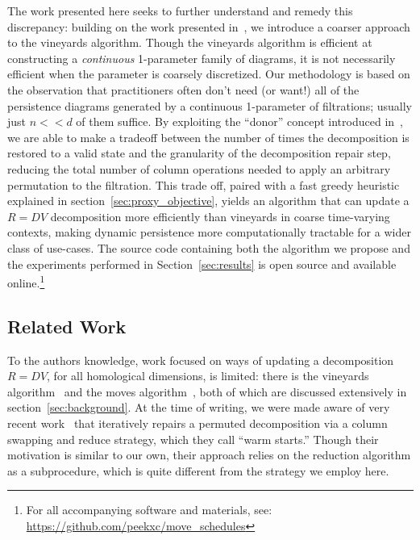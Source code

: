 \documentclass[sn-mathphys]{sn-jnl}
\begin{document}
The work presented here seeks to further understand and remedy this discrepancy: building on the work presented in~\cite{busaryev2010tracking}, we introduce a coarser approach to the vineyards algorithm.
Though the vineyards algorithm is efficient at constructing a \emph{continuous} 1-parameter family of diagrams, it is not necessarily efficient when the parameter is coarsely discretized.
Our methodology is based on the observation that practitioners often don't need (or want!) all of the persistence diagrams generated by a continuous 1-parameter of filtrations; usually just $n << d$ of them  suffice.   
By exploiting the ``donor'' concept introduced in~\cite{busaryev2010tracking}, we are able to make a tradeoff between the number of times the decomposition is restored to a valid state and the granularity of the decomposition repair step, reducing the total number of column operations needed to apply an arbitrary permutation to the filtration. This trade off, paired with a fast greedy heuristic explained in section~\ref{sec:proxy_objective}, yields an algorithm that can update a $R = DV$ decomposition more efficiently than vineyards in coarse time-varying contexts, making dynamic persistence more computationally tractable for a wider class of use-cases. 
The source code containing both the algorithm we propose and the experiments performed in Section~\ref{sec:results} is open source and available online.\footnote{ For all accompanying software and materials, see: \url{https://github.com/peekxc/move_schedules}}
  
\subsection{Related Work}\label{sec:related_work} 
To the authors knowledge, work focused on ways of updating a  decomposition $R = DV$, for all homological dimensions, is limited: there is the vineyards algorithm~\cite{cohen2006vines} and the moves algorithm~\cite{busaryev2010tracking}, both of which are discussed extensively in section~\ref{sec:background}. At the time of writing, we were made aware of very recent work~\cite{luo2021accelerating} that iteratively repairs a permuted decomposition via a column swapping and reduce strategy, which they call ``warm starts.'' Though their motivation is similar to our own, their approach relies on the reduction algorithm as a subprocedure, which is quite different from the strategy we employ here.
\end{document}
